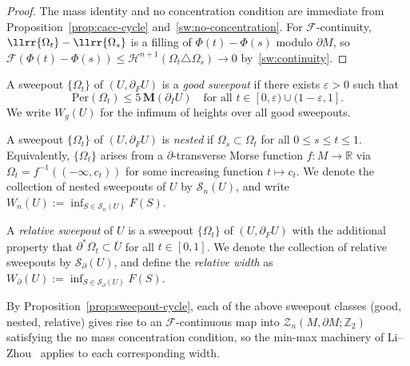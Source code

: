 \begin{proof}
The mass identity and no concentration condition are immediate from Proposition~\ref{prop:cacc-cycle} and~\ref{sw:no-concentration}. For $\mathcal{F}$-continuity, $\llrr{\Omega_t} - \llrr{\Omega_s}$ is a filling of $\Phi(t) - \Phi(s)$ modulo $\partial M$, so $\mathcal{F}(\Phi(t) - \Phi(s)) \leq \mathcal{H}^{n+1}(\Omega_t \triangle \Omega_s) \to 0$ by~\ref{sw:continuity}.
\end{proof}

\begin{definition}\label{def:good-sweepout}
A sweepout $\{\Omega_t\}$ of $(U, \partial_F U)$ is a \emph{good sweepout} if there exists $\varepsilon > 0$ such that
\[
\mathrm{Per}(\Omega_t) \leq 5\,\mathbf{M}(\partial_I U) \quad \text{for all } t \in [0, \varepsilon) \cup (1-\varepsilon, 1].
\]
We write $W_g(U)$ for the infimum of heights over all good sweepouts.
\end{definition}

\begin{definition}\label{def:nested-sweepout}
A sweepout $\{\Omega_t\}$ of $(U, \partial_F U)$ is \emph{nested} if $\Omega_s \subset \Omega_t$ for all $0 \leq s \leq t \leq 1$. Equivalently, $\{\Omega_t\}$ arises from a $\partial$-transverse Morse function $f: M \to \mathbb{R}$ via $\Omega_t = f^{-1}((-\infty, c_t))$ for some increasing function $t \mapsto c_t$. We denote the collection of nested sweepouts of $U$ by $\mathcal{S}_n(U)$, and write $W_n(U) := \inf_{S \in \mathcal{S}_n(U)} F(S)$.
\end{definition}

\begin{definition}\label{def:relative-sweepout}
A \emph{relative sweepout} of $U$ is a sweepout $\{\Omega_t\}$ of $(U, \partial_F U)$ with the additional property that $\partial^*\Omega_t \subset \overline{U}$ for all $t \in [0,1]$. We denote the collection of relative sweepouts by $\mathcal{S}_\partial(U)$, and define the \emph{relative width} as $W_\partial(U) := \inf_{S \in \mathcal{S}_\partial(U)} F(S)$.
\end{definition}

By Proposition~\ref{prop:sweepout-cycle}, each of the above sweepout classes (good, nested, relative) gives rise to an $\mathcal{F}$-continuous map into $\mathcal{Z}_n(M, \partial M;\mathbb{Z}_2)$ satisfying the no mass concentration condition, so the min-max machinery of Li--Zhou~\cite{LZ17} applies to each corresponding width.

